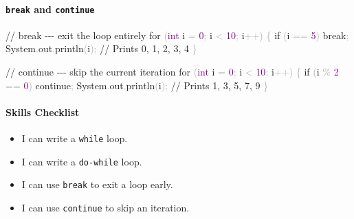 \documentclass[
  justified,
  openright,
]{tufte-book}
\let\subsubsection\paragraph
\let\paragraph\paragraph
\newcommand{\BuiltInTok}[1]{#1}
\newcommand{\CommentTok}[1]{\textcolor{MidGray}{#1}}
\newcommand{\ControlFlowTok}[1]{\textcolor{BrandBlue}{#1}}
\newcommand{\DataTypeTok}[1]{\textcolor{Purple}{#1}}
\newcommand{\DecValTok}[1]{\textcolor{Purple}{#1}}
\newcommand{\FunctionTok}[1]{\textcolor{BrandBlue}{#1}}
\newcommand{\NormalTok}[1]{#1}
\newcommand{\OperatorTok}[1]{\textcolor{DarkGray}{#1}}
\newenvironment{Shaded}{%
  \begin{snugshade}
}{%
  \end{snugshade}
}
\let\subsubsection\paragraph
\let\paragraph\paragraph
\providecommand{\tightlist}{%
  \setlength{\itemsep}{0pt}\setlength{\parskip}{0pt}}
\begin{document}
\subsubsection{\texorpdfstring{\texttt{break} and
\texttt{continue}}{break and continue}}\label{break-and-continue}

\begin{Shaded}
\begin{Highlighting}[]
\CommentTok{// break {-}{-}{-} exit the loop entirely}
\ControlFlowTok{for} \OperatorTok{(}\DataTypeTok{int}\NormalTok{ i }\OperatorTok{=} \DecValTok{0}\OperatorTok{;}\NormalTok{ i }\OperatorTok{\textless{}} \DecValTok{10}\OperatorTok{;}\NormalTok{ i}\OperatorTok{++)} \OperatorTok{\{}
    \ControlFlowTok{if} \OperatorTok{(}\NormalTok{i }\OperatorTok{==} \DecValTok{5}\OperatorTok{)} \ControlFlowTok{break}\OperatorTok{;}
    \BuiltInTok{System}\OperatorTok{.}\FunctionTok{out}\OperatorTok{.}\FunctionTok{println}\OperatorTok{(}\NormalTok{i}\OperatorTok{);}   \CommentTok{// Prints 0, 1, 2, 3, 4}
\OperatorTok{\}}

\CommentTok{// continue {-}{-}{-} skip the current iteration}
\ControlFlowTok{for} \OperatorTok{(}\DataTypeTok{int}\NormalTok{ i }\OperatorTok{=} \DecValTok{0}\OperatorTok{;}\NormalTok{ i }\OperatorTok{\textless{}} \DecValTok{10}\OperatorTok{;}\NormalTok{ i}\OperatorTok{++)} \OperatorTok{\{}
    \ControlFlowTok{if} \OperatorTok{(}\NormalTok{i }\OperatorTok{\%} \DecValTok{2} \OperatorTok{==} \DecValTok{0}\OperatorTok{)} \ControlFlowTok{continue}\OperatorTok{;}
    \BuiltInTok{System}\OperatorTok{.}\FunctionTok{out}\OperatorTok{.}\FunctionTok{println}\OperatorTok{(}\NormalTok{i}\OperatorTok{);}   \CommentTok{// Prints 1, 3, 5, 7, 9}
\OperatorTok{\}}
\end{Highlighting}
\end{Shaded}

\subsubsection{Skills Checklist}\label{skills-checklist-9}

\begin{itemize}
\tightlist
\item[$\square$]
  I can write a \texttt{while} loop.
\item[$\square$]
  I can write a \texttt{do-while} loop.
\item[$\square$]
  I can use \texttt{break} to exit a loop early.
\item[$\square$]
  I can use \texttt{continue} to skip an iteration.
\end{itemize}
\end{document}
